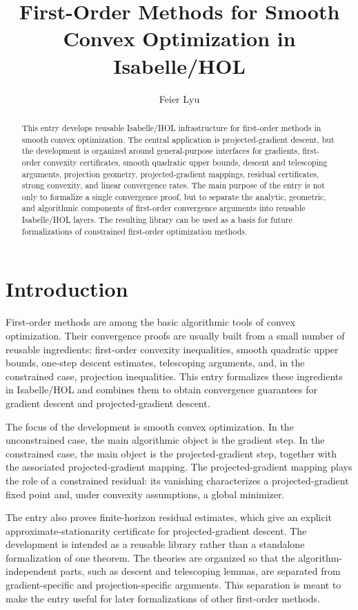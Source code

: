 \documentclass[11pt,a4paper]{article}
\begin{document}
\title{First-Order Methods for Smooth Convex Optimization in Isabelle/HOL}
\author{Feier Lyu}
\maketitle

\begin{abstract}
This entry develops reusable Isabelle/HOL infrastructure for first-order methods in smooth convex optimization.
The central application is projected-gradient descent, but the development is organized around general-purpose interfaces for gradients, first-order convexity certificates, smooth quadratic upper bounds, descent and telescoping arguments, projection geometry, projected-gradient mappings, residual certificates, strong convexity, and linear convergence rates.
The main purpose of the entry is not only to formalize a single convergence proof, but to separate the analytic, geometric, and algorithmic components of first-order convergence arguments into reusable Isabelle/HOL layers.
The resulting library can be used as a basis for future formalizations of constrained first-order optimization methods.
\end{abstract}

\tableofcontents

\section{Introduction}

First-order methods are among the basic algorithmic tools of convex optimization.
Their convergence proofs are usually built from a small number of reusable ingredients: first-order convexity inequalities, smooth quadratic upper bounds, one-step descent estimates, telescoping arguments, and, in the constrained case, projection inequalities.
This entry formalizes these ingredients in Isabelle/HOL and combines them to obtain convergence guarantees for gradient descent and projected-gradient descent.

The focus of the development is smooth convex optimization.
In the unconstrained case, the main algorithmic object is the gradient step.
In the constrained case, the main object is the projected-gradient step, together with the associated projected-gradient mapping.
The projected-gradient mapping plays the role of a constrained residual: its vanishing characterizes a projected-gradient fixed point and, under convexity assumptions, a global minimizer.

The entry also proves finite-horizon residual estimates, which give an explicit approximate-stationarity certificate for projected-gradient descent.
The development is intended as a reusable library rather than a standalone formalization of one theorem.
The theories are organized so that the algorithm-independent parts, such as descent and telescoping lemmas, are separated from gradient-specific and projection-specific arguments.
This separation is meant to make the entry useful for later formalizations of other first-order methods.
\end{document}
